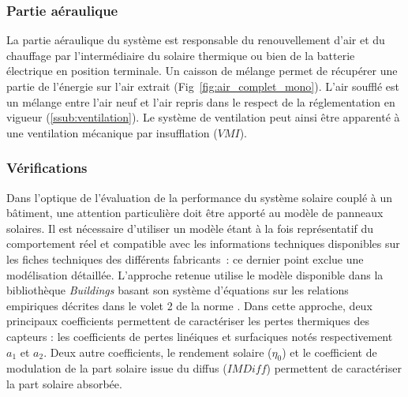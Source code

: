 \subsubsection{Partie aéraulique} %
\label{ssub:partie_aéraulique}
La partie aéraulique du système est responsable du renouvellement d’air et du chauffage
par l’intermédiaire du solaire thermique ou bien de la batterie électrique en
position terminale. Un caisson de mélange permet de récupérer une partie de l’énergie
sur l’air extrait (Fig~\ref{fig:air_complet_mono}). L’air soufflé est un mélange entre
l’air neuf et l’air repris dans le respect de la réglementation en vigueur (\ref{ssub:ventilation}).
Le système de ventilation peut ainsi être apparenté à une ventilation mécanique par insufflation
($VMI$).


\subsubsection{Vérifications} %
\label{ssub:verifications}
Dans l’optique de l’évaluation de la performance  du système solaire couplé à un bâtiment,
une attention particulière doit être apporté au modèle de panneaux solaires. Il est
nécessaire d’utiliser un modèle étant à la fois représentatif du comportement réel et
compatible avec les informations techniques disponibles sur les fiches techniques des
différents fabricants~: ce dernier point exclue une modélisation détaillée. L’approche
retenue utilise le modèle disponible dans la bibliothèque \emph{Buildings} basant son
système d’équations sur les relations empiriques décrites dans le volet 2 de la norme
\textcite{EN129752}. Dans cette approche, deux principaux coefficients permettent de
caractériser les pertes thermiques des capteurs : les coefficients de pertes linéiques et
surfaciques notés respectivement $a_{1}$ et $a_{2}$. Deux autre coefficients, le rendement
solaire ($\eta_{0}$) et le coefficient de modulation de la part solaire issue du diffus
($IMDiff$) permettent de caractériser la part solaire absorbée.

